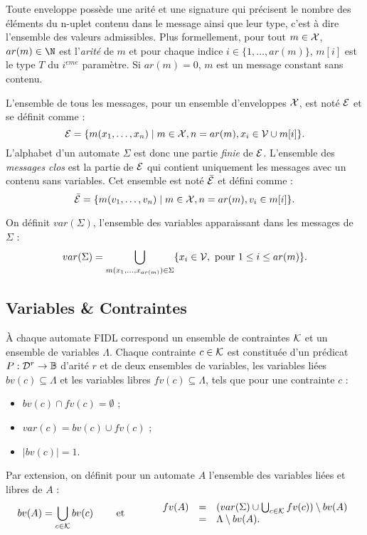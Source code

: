 Toute enveloppe poss\`ede une arit\'e et une
signature qui pr\'ecisent le nombre des \'el\'ements du n-uplet
contenu dans le message ainsi que leur type, c'est \`a dire
l'ensemble des valeurs admissibles. Plus formellement, pour tout  $m\in
{\cal X}$, $ar(m)
\in \N$ est l'\emph{arit\'e} de $m$ et pour chaque indice $i\in
\{1,\dots,ar(m)\}$, $m[i]$ est le type 
$T$ du $i^{eme}$ param\`etre. Si $ar(m)=0$, $m$ est un message constant sans contenu. 

L'ensemble de tous les messages, pour un ensemble d'enveloppes $\cal X$, est not\'e ${\cal E}$ et se
d\'efinit comme :
$$
{\cal E } = \{ m(x_1,\dots,x_n) \mid m\in {\cal X},n =ar(m), x_i \in {\cal V}\cup m[i]\}.
$$
L'alphabet d'un automate $\Sigma$ est donc une partie \emph{finie}  de
$\cal E$. L'ensemble des \emph{messages clos} est la  partie de $\cal E$
qui contient uniquement les messages avec un contenu sans
variables. Cet ensemble est not\'e $\bar{\cal E}$ et d\'efini comme :
$$
\bar{\cal E } = \{ m(v_1,\dots,v_n) \mid m\in {\cal X},n =ar(m), v_i \in  m[i]\}.
$$

On d\'efinit $var(\Sigma)$, l'ensemble des variables
apparaissant dans les messages de  $\Sigma$ :
$$
var(\Sigma) = \bigcup_{m(x_1,\dots,x_{ar(m)}) \in \Sigma}\{x_i\in {\cal V}, \mbox{~pour~}
1\leq i\leq ar(m) \}.
$$

\subsection{Variables \& Contraintes}

\`A chaque automate \textsf{FIDL} correspond un ensemble de
contraintes $\cal K$ et un ensemble de variables $\Lambda$. Chaque
contrainte $c\in {\cal K}$ est constitu\'ee d'un pr\'edicat $P:{\cal D}^r\rightarrow
\mathbb{B}$ d'arit\'e $r$ et de deux ensembles de
variables, les variables li\'ees $bv(c)\subseteq \Lambda$ et les
variables libres $fv(c)\subseteq
\Lambda$, tels que pour une contrainte $c$ :
\begin{itemize}
  \item $bv(c) \cap fv(c) =\emptyset$ ;
  \item $var(c) = bv(c)  \cup fv(c)$ ;
  \item $\vert bv(c) \vert = 1$.
\end{itemize}

Par extension, on d\'efinit pour un automate $A$ l'ensemble des
variables li\'ees et libres de $A$ :
\begin{align*}
    bv(A) = \bigcup_{c\in {\cal K}} bv(c) &\qquad\mbox{~et~}\qquad&
    \begin{array}{rcl}
fv(A) &= &(var(\Sigma) \cup \bigcup_{c\in {\cal K}} fv(c) )
    \setminus bv(A) \\
&=& \Lambda \setminus bv(A).
\end{array}
\end{align*}

